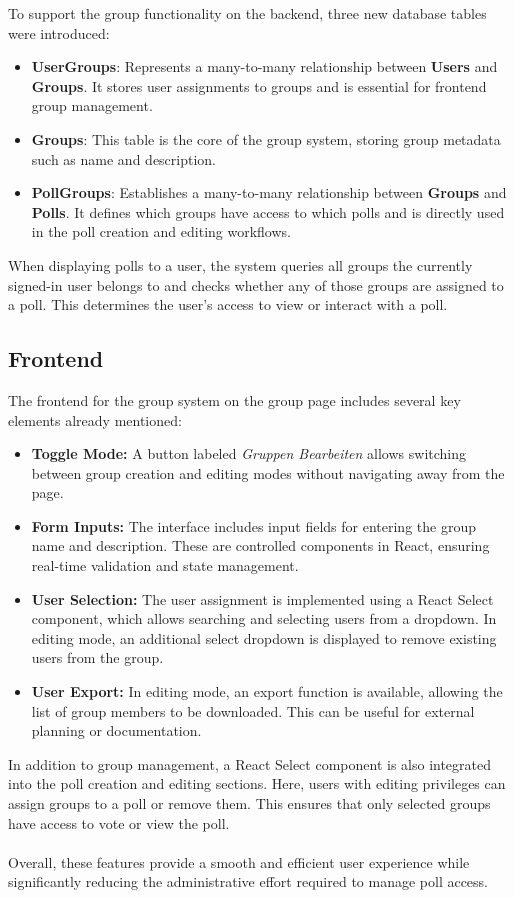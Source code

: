 \documentclass[a4paper,12pt]{report}
\begin{document}
To support the group functionality on the backend, three new database tables were introduced:

\begin{itemize}
	\item \textbf{UserGroups}: Represents a many-to-many relationship between \textbf{Users} and \textbf{Groups}. It stores user assignments to groups and is essential for frontend group management.
	\item \textbf{Groups}: This table is the core of the group system, storing group metadata such as name and description.
	\item \textbf{PollGroups}: Establishes a many-to-many relationship between \textbf{Groups} and \textbf{Polls}. It defines which groups have access to which polls and is directly used in the poll creation and editing workflows. \\
\end{itemize}
When displaying polls to a user, the system queries all groups the currently signed-in user belongs to and checks whether any of those groups are assigned to a poll. This determines the user's access to view or interact with a poll.

\subsection{Frontend}
The frontend for the group system on the group page includes several key elements already mentioned:
\begin{itemize}
	\item \textbf{Toggle Mode:} A button labeled \textit{Gruppen Bearbeiten} allows switching between group creation and editing modes without navigating away from the page.
	\item \textbf{Form Inputs:} The interface includes input fields for entering the group name and description. These are controlled components in React, ensuring real-time validation and state management.
	\item \textbf{User Selection:} The user assignment is implemented using a React Select component, which allows searching and selecting users from a dropdown. In editing mode, an additional select dropdown is displayed to remove existing users from the group.
	\item \textbf{User Export:} In editing mode, an export function is available, allowing the list of group members to be downloaded. This can be useful for external planning or documentation.
\end{itemize}
In addition to group management, a React Select component is also integrated into the poll creation and editing sections. Here, users with editing privileges can assign groups to a poll or remove them. This ensures that only selected groups have access to vote or view the poll. \\ \\
Overall, these features provide a smooth and efficient user experience while significantly reducing the administrative effort required to manage poll access.
\end{document}
